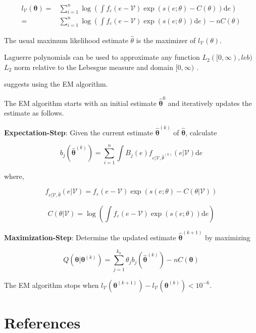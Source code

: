 \documentclass[
  12pt]{article}
\theoremstyle{definition}
\theoremstyle{remark}
\begin{document}
\[
\begin{aligned}
    l_{\mathcal{V}}(\mathbf{\theta})=&\sum_{i=1}^{n}\log \left(\int f_{\varepsilon}(e-\mathcal{V})\exp(s(e;\theta)-C(\theta))\text{d}e\right)\\
    =&\sum_{i=1}^{n}\log \left(\int f_{\varepsilon}(e-\mathcal{V})\exp(s(e;\theta))\text{d}e\right)-nC(\theta)
\end{aligned}
\]

The usual maximum likelihood estimate \(\hat{\theta}\) is the maximizer
of \(l_{\mathcal{V}}(\theta)\).

Laguerre polynomials can be used to approximate any function
\(L_2([0,\infty), leb)\) \(L_2\) norm relative to the Lebesgue measure
and domain \([0,\infty)\) \citep{Chen2007}.

\citet{Kang2021} suggests using the EM algorithm.

The EM algorithm starts with an initial estimate
\(\hat{\mathbf{\theta}}^0\) and iteratively updates the estimate as
follows.

\textbf{Expectation-Step}: Given the current estimate
\(\hat{\mathbf{\theta}}^{(k)}\) of \(\hat{\mathbf{\theta}}\), calculate

\[
 b_j \left(\hat{\mathbf{\theta}}^{(k)}\right) = \sum_{i=1}^{n}\int B_j(e)f_{e|\mathcal{V},\hat{\theta}^{(k)}}(e|\mathcal{V})\text{d}e
\]

where,

\[
f_{e|\mathcal{V},\hat{\theta}}(e|\mathcal{V}) = f_{\varepsilon}(e-\mathcal{V})\exp(s(e;\theta)-C(\theta|\mathcal{V}))
\]

\[
C(\theta|\mathcal{V})=\log\left(\int f_{\varepsilon}(e-\mathcal{V})\exp(s(e;\theta))\text{d}e\right)
\]

\textbf{Maximization-Step}: Determine the updated estimate
\(\hat{\mathbf{\theta}}^{(k+1)}\) by maximizing

\[
Q(\mathbf{\theta}|\mathbf{\theta}^{(k)}) = \sum_{j=1}^{k_n}\theta_j b_j \left(\hat{\mathbf{\theta}}^{(k)}\right) - nC(\mathbf{\theta})
\]

The EM algorithm stops when
\(l_{\mathcal{V}}(\mathbf{\theta}^{(k+1)})-l_{\mathcal{V}}(\mathbf{\theta}^{(k)})<10^{-6}\).

\section*{References}\label{references}

\renewcommand{\bibsection}{}

\end{document}
